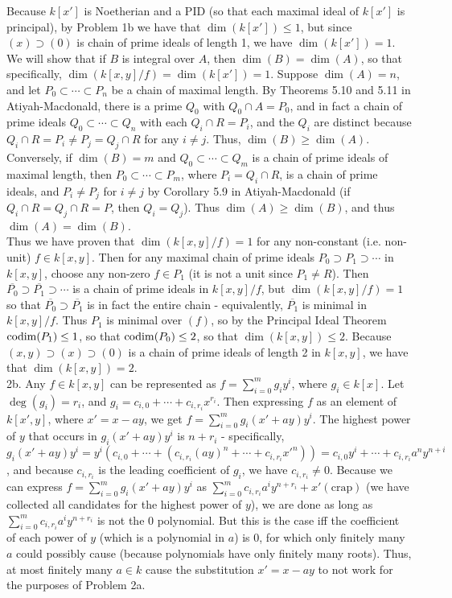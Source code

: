 \documentclass[11pt]{article}
\begin{document}
Because $k[x']$ is Noetherian and a PID (so that each maximal
ideal of $k[x']$ is principal), by Problem 1b we have that
$\dim(k[x'])\leq1$, but since $(x)\supset (0)$ is chain of prime
ideals of length 1, we have $\dim(k[x'])=1$. We will show that if $B$
is integral over $A$, then $\dim(B)=\dim(A)$, so that specifically,
$\dim(k[x,y]/f)=\dim(k[x'])=1$. Suppose $\dim(A)=n$, and let
$P_0\subset\cdots\subset P_n$ be a chain of maximal length. By Theorems 5.10
and 5.11 in Atiyah-Macdonald, there is a prime $Q_0$ with $Q_0\cap A=P_0$,
and in fact a chain of prime ideals $Q_0\subset \cdots\subset Q_n$ with
each $Q_i\cap R=P_i$, and the $Q_i$ are distinct because $Q_i\cap R=P_i\neq
P_j=Q_j\cap R$ for any $i\neq j$. Thus, $\dim(B)\geq\dim(A)$. Conversely, if
$\dim(B)=m$ and $Q_0\subset\cdots\subset Q_m$ is a chain of prime ideals of
maximal length, then $P_0\subset\cdots\subset P_m$, where $P_i=Q_i\cap R$,
is a chain of prime ideals, and $P_i\neq P_j$ for $i\neq j$ by Corollary
5.9 in Atiyah-Macdonald (if $Q_i\cap R=Q_j\cap R=P$, then $Q_i=Q_j$). Thus
$\dim(A)\geq\dim(B)$, and thus $\dim(A)=\dim(B)$.\\

Thus we have proven that $\dim(k[x,y]/f)=1$ for any non-constant
(i.e. non-unit) $f\in k[x,y]$. Then for any maximal chain of prime ideals
$P_0\supset P_1\supset\cdots$ in $k[x,y]$, choose any non-zero $f\in
P_1$ (it is not a unit since $P_1\neq R$). Then $\overline{P_0}\supset
\overline{P_1}\supset\cdots$ is a chain of prime ideals in $k[x,y]/f$,
but $\dim(k[x,y]/f)=1$ so that $\overline{P_0}\supset\overline{P_1}$
is in fact the entire chain - equivalently, $\overline{P_1}$ is minimal
in $k[x,y]/f$. Thus $P_1$ is minimal over $(f)$, so by the Principal
Ideal Theorem $\operatorname{codim}(P_1)\leq 1$, so that $\operatorname{codim}(P_0)\leq 2$, so that
$\dim(k[x,y])\leq2$. Because $(x,y)\supset (x)\supset (0)$ is a chain of
prime ideals of length 2 in $k[x,y]$, we have that $\dim(k[x,y])=2$.   \\

\num{2b.} Any $f\in k[x,y]$ can be represented as $f=\sum_{i=0}^m
g_iy^i$, where $g_i\in k[x]$. Let $\deg(g_i)=r_i$, and
$g_i=c_{i,0}+\cdots+c_{i,r_i}x^{r_i}$. Then expressing $f$ as an element
of $k[x',y]$, where $x'=x-ay$, we get $f=\sum_{i=0}^m g_i(x'+ay)y^i$. The
highest power of $y$ that occurs in $g_i(x'+ay)y^i$ is $n+r_i$ - specifically,
$g_i(x'+ay)y^i=y^i(c_{i,0}+\cdots+(c_{i,r_i}(ay)^n+\cdots+c_{i,r_i}x'^n))=c_{i,0}y^i+\cdots+c_{i,r_i}a^ny^{n+i}$,
and because $c_{i,r_i}$ is the leading coefficient of $g_i$, we have
$c_{i,r_i}\neq0$. Because we can express $f=\sum_{i=0}^m g_i(x'+ay)y^i$ as
$\sum_{i=0}^m c_{i,r_i}a^iy^{n+r_i} + x'(\text{crap})$ (we have collected all
candidates for the highest power of $y$), we are done as long as $\sum_{i=0}^m
c_{i,r_i}a^iy^{n+r_i}$ is not the 0 polynomial. But this is the case iff
the coefficient of each power of $y$ (which is a polynomial in $a$) is 0,
for which only finitely many $a$ could possibly cause (because polynomials
have only finitely many roots). Thus, at most finitely many $a\in k$ cause
the substitution $x'=x-ay$ to not work for the purposes of Problem 2a.    \\
\end{document}
